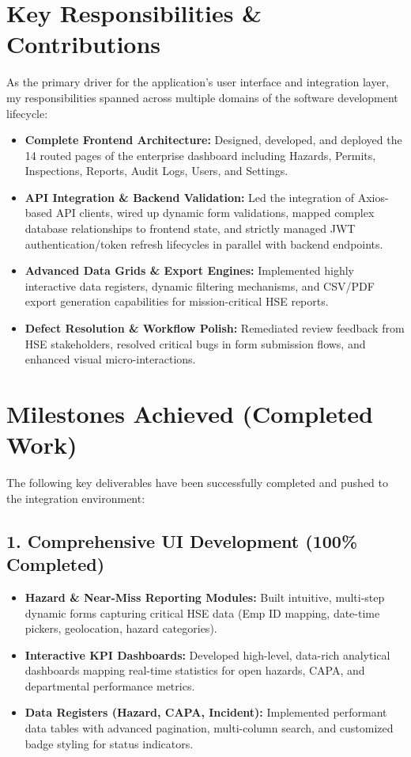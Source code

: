 \documentclass[12pt, a4paper]{article}
\begin{document}
\section{Key Responsibilities \& Contributions}
As the primary driver for the application's user interface and integration layer, my responsibilities spanned across multiple domains of the software development lifecycle:
\begin{itemize}[leftmargin=*, label=\textcolor{primary}{$\bullet$}]
    \item \textbf{Complete Frontend Architecture:} Designed, developed, and deployed the 14 routed pages of the enterprise dashboard including Hazards, Permits, Inspections, Reports, Audit Logs, Users, and Settings.
    \item \textbf{API Integration \& Backend Validation:} Led the integration of Axios-based API clients, wired up dynamic form validations, mapped complex database relationships to frontend state, and strictly managed JWT authentication/token refresh lifecycles in parallel with backend endpoints.
    \item \textbf{Advanced Data Grids \& Export Engines:} Implemented highly interactive data registers, dynamic filtering mechanisms, and CSV/PDF export generation capabilities for mission-critical HSE reports.
    \item \textbf{Defect Resolution \& Workflow Polish:} Remediated review feedback from HSE stakeholders, resolved critical bugs in form submission flows, and enhanced visual micro-interactions.
\end{itemize}

\section{Milestones Achieved (Completed Work)}
The following key deliverables have been successfully completed and pushed to the integration environment:

\subsection{1. Comprehensive UI Development (100\% Completed)}
\begin{itemize}[leftmargin=*, label=$\circ$]
    \item \textbf{Hazard \& Near-Miss Reporting Modules:} Built intuitive, multi-step dynamic forms capturing critical HSE data (Emp ID mapping, date-time pickers, geolocation, hazard categories).
    \item \textbf{Interactive KPI Dashboards:} Developed high-level, data-rich analytical dashboards mapping real-time statistics for open hazards, CAPA, and departmental performance metrics.
    \item \textbf{Data Registers (Hazard, CAPA, Incident):} Implemented performant data tables with advanced pagination, multi-column search, and customized badge styling for status indicators.
\end{itemize}
\end{document}
